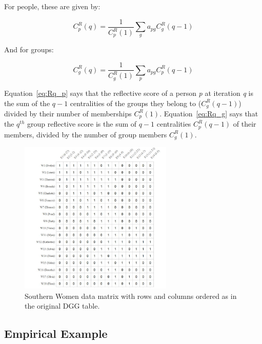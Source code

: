 \documentclass[a4paper,fleqn]{cas-sc}
\begin{document}
For people, these are given by:

\begin{equation}   
    C^R_p(q) = \frac{1}{C^R_p(1)}\sum_g a_{pg}C^R_g(q-1) 
   \label{eq:Rq_p}
\end{equation}

And for groups:

\begin{equation}
   C^R_g(q) = \frac{1}{C^R_g(1)}\sum_p a_{pg}C^R_p(q-1)
   \label{eq:Rq_g}
\end{equation}

Equation~\ref{eq:Rq_p} says that the reflective score of a person \textit{p} at iteration \textit{q} is the sum of the $q-1$ centralities of the groups they belong to ($C^R_g(q-1)$) divided by their number of memberships $C^{R}_p(1)$. Equation~\ref{eq:Rq_g} says that the $q^{th}$ group reflective score is the sum of $q-1$ centralities $C^R_p(q-1)$ of their members, divided by the number of group members $C^R_g(1)$.

\begin{figure}[ht!]
    \captionsetup[subfigure]{font=footnotesize,labelfont=footnotesize}
    \centering
    \includegraphics[width=0.65\textwidth]{Plots/southern-women.jpg}
    \caption{Southern Women data matrix with rows and columns ordered as in the original DGG table.}
    \label{fig:sw}
\end{figure}

\subsection{Empirical Example} \label{subsec:ex}
\end{document}
